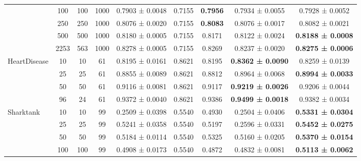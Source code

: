 \begin{table}
{\begin{tabular}[H]{@{}lcccccccc@{}}
                              & 100   & 100  & 1000 & 0.7903 ± 0.0048      & 0.7155               & \textbf{0.7956} & 0.7934 ± 0.0055          & 0.7928 ± 0.0052          \\
                              & 250   & 250  & 1000 & 0.8076 ± 0.0020      & 0.7155               & \textbf{0.8083} & 0.8076 ± 0.0017          & 0.8082 ± 0.0021          \\
                              & 500   & 500  & 1000 & 0.8180 ± 0.0005      & 0.7155               & 0.8171          & 0.8122 ± 0.0024          & \textbf{0.8188 ± 0.0008} \\
                              & 2253  & 563  & 1000 & 0.8278 ± 0.0005      & 0.7155               & 0.8269          & 0.8237 ± 0.0020          & \textbf{0.8275 ± 0.0006} \\
                              \midrule
\multirow{4}{*}{HeartDisease} & 10    & 10   & 61   & 0.8195 ± 0.0161      & 0.8621               & 0.8195          & \textbf{0.8362 ± 0.0090} & 0.8259 ± 0.0139          \\
                              & 25    & 25   & 61   & 0.8855 ± 0.0089      & 0.8621               & 0.8812          & 0.8964 ± 0.0068          & \textbf{0.8994 ± 0.0033} \\
                              & 50    & 50   & 61   & 0.9116 ± 0.0081      & 0.8621               & 0.9117          & \textbf{0.9219 ± 0.0026} & 0.9206 ± 0.0044          \\
                              & 96    & 24   & 61   & 0.9372 ± 0.0040      & 0.8621               & 0.9386          & \textbf{0.9499 ± 0.0018} & 0.9382 ± 0.0034          \\
                              \midrule
\multirow{5}{*}{Sharktank}    & 10    & 10   & 99   & 0.2509 ± 0.0398      & 0.5540               & 0.4930          & 0.2504 ± 0.0406          & \textbf{0.5331 ± 0.0304} \\
                              & 25    & 25   & 99   & 0.5241 ± 0.0358      & 0.5540               & 0.5197          & 0.2596 ± 0.0331          & \textbf{0.5452 ± 0.0275} \\
                              & 50    & 50   & 99   & 0.5184 ± 0.0114      & 0.5540               & 0.5325          & 0.5160 ± 0.0205          & \textbf{0.5370 ± 0.0154} \\
                              & 100   & 100  & 99   & 0.4908 ± 0.0173      & 0.5540               & 0.4872          & 0.4832 ± 0.0081          & \textbf{0.5113 ± 0.0062} \\

\end{tabular}}
\end{table}
